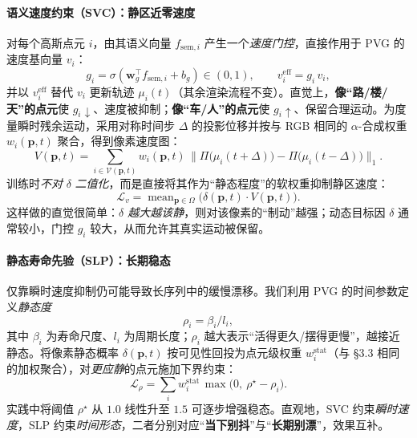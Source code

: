 \documentclass[10pt,conference]{IEEEtran} %
\begin{document}
\paragraph{语义速度约束（SVC）：静区近零速度}
对每个高斯点元 $i$，由其语义向量 $f_{\mathrm{sem},i}$ 产生一个\emph{速度门控}，直接作用于 PVG 的速度基向量 $v_i$：
\begin{equation}
g_i=\sigma(\mathbf w_g^\top f_{\mathrm{sem},i}+b_g)\in(0,1),\qquad
v_i^{\mathrm{eff}}=g_i\,v_i,
\label{eq:svc_gate}
\end{equation}
并以 $v_i^{\mathrm{eff}}$ 替代 $v_i$ 更新轨迹 $\mu_i(t)$（其余渲染流程不变）。直觉上，\textbf{像“路/楼/天”的点元}使 $g_i\!\downarrow$、速度被抑制；\textbf{像“车/人”的点元}使 $g_i\!\uparrow$、保留合理运动。为度量瞬时残余运动，采用对称时间步 $\Delta$ 的投影位移并按与 RGB 相同的 $\alpha$-合成权重 $w_i(\mathbf p,t)$ 聚合，得到像素速度图：
\begin{equation}
V(\mathbf p,t)=\sum_{i\in\mathcal V(\mathbf p,t)} w_i(\mathbf p,t)\,
\big\|\Pi\!\big(\mu_i(t+\Delta)\big)-\Pi\!\big(\mu_i(t-\Delta)\big)\big\|_1 .
\label{eq:vel_map}
\end{equation}
训练时\emph{不对} $\delta$ \emph{二值化}，而是直接将其作为“静态程度”的软权重抑制静区速度：
\begin{equation}
\mathcal L_{v}=\operatorname{mean}_{\mathbf p\in\Omega}\!\big(\delta(\mathbf p,t)\cdot V(\mathbf p,t)\big).
\label{eq:svc_loss}
\end{equation}
这样做的直觉很简单：\emph{$\delta$ 越大越该静}，则对该像素的“制动”越强；动态目标因 $\delta$ 通常较小，门控 $g_i$ 较大，从而允许其真实运动被保留。

\paragraph{静态寿命先验（SLP）：长期稳态}
仅靠瞬时速度抑制仍可能导致长序列中的缓慢漂移。我们利用 PVG 的时间参数定义\emph{静态度}
\begin{equation}
\rho_i=\beta_i/l_i,
\label{eq:rho_def}
\end{equation}
其中 $\beta_i$ 为寿命尺度、$l_i$ 为周期长度；$\rho_i$ 越大表示“活得更久/摆得更慢”，越接近静态。将像素静态概率 $\delta(\mathbf p,t)$ 按可见性回投为点元级权重 $w_i^{\mathrm{stat}}$（与 §3.3 相同的加权聚合），对\emph{更应静}的点元施加下界约束：
\begin{equation}
\mathcal L_{\rho}=\sum_{i} w_i^{\mathrm{stat}}\,
\max\!\big(0,\ \rho^\star-\rho_i\big).
\label{eq:slp_loss}
\end{equation}
实践中将阈值 $\rho^\star$ 从 $1.0$ 线性升至 $1.5$ 可逐步增强稳态。直观地，SVC 约束\emph{瞬时速度}，SLP 约束\emph{时间形态}，二者分别对应“\textbf{当下别抖}”与“\textbf{长期别漂}”，效果互补。
\end{document}
